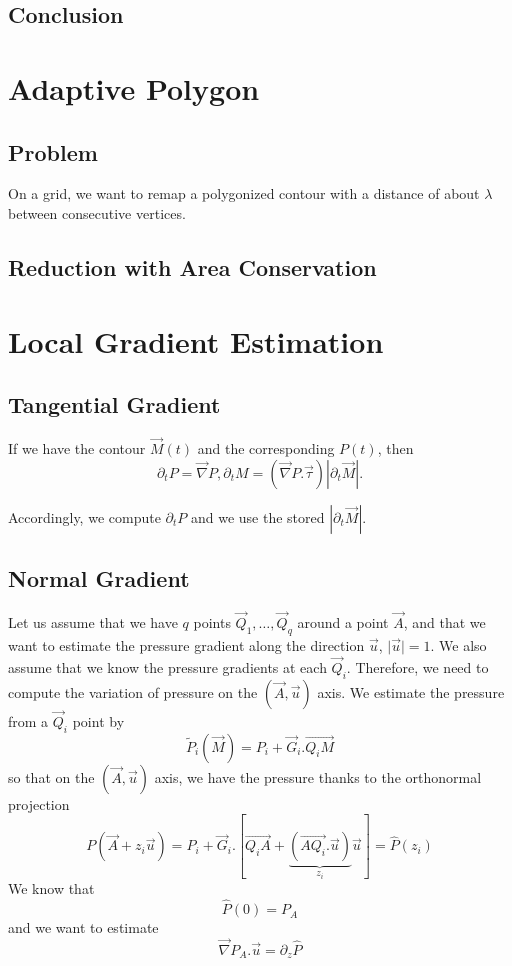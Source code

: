 \documentclass[aps]{revtex4}
\newcommand{\myvec}[1]{\overrightarrow{#1}}
\newcommand{\mygrad}{\vec{\nabla}}
\begin{document}
\subsection{Conclusion}

\section{Adaptive Polygon}

\subsection{Problem}
On a grid, we want to remap a polygonized contour with a distance of about $\lambda$ between consecutive vertices.

\subsection{Reduction with Area Conservation}


\section{Local Gradient Estimation}

\subsection{Tangential Gradient}
If we have the contour $\vec{M}(t)$ and the corresponding $P(t)$, then
$$
	\partial_t P = \mygrad P , \partial_t M = \left(\mygrad P . \vec{\tau}\right) \left|\partial_t \vec{M}\right|.
$$

Accordingly, we compute $\partial_t P$ and we use the stored $\left|\partial_t \vec{M}\right|$.

\subsection{Normal Gradient}

Let us assume that we have $q$ points $\vec{Q}_1,\ldots,\vec{Q}_{q}$ around a point $\vec{A}$, and that we want to
estimate the pressure gradient along the direction $\vec{u}$, $\vert\vec{u}\vert=1$. 
We also assume that we know the pressure gradients at each $\vec{Q}_i$.
Therefore, we need to compute the variation of pressure on the $(\vec{A},\vec{u})$ axis.
We estimate the pressure from a $\vec{Q}_i$ point by
$$
	\tilde{P}_i(\vec{M}) = P_i + \vec{G}_i.\myvec{Q_iM}
$$
so that on the  $(\vec{A},\vec{u})$ axis, we have the pressure thanks to the orthonormal projection
$$
	P(\vec{A}+z_i \vec{u}) = P_i + \vec{G}_i.\left\lbrack\myvec{Q_iA} + \underbrace{\left(\myvec{AQ_i}.\vec{u}\right)}_{z_i}\vec{u}\right\rbrack
	= \hat{P}(z_i)
$$
We know that
$$
	\hat{P}(0) = P_A
$$
and we want to estimate
$$
	\mygrad P_A . \vec{u} = \partial_z \hat{P}
$$
\end{document}
